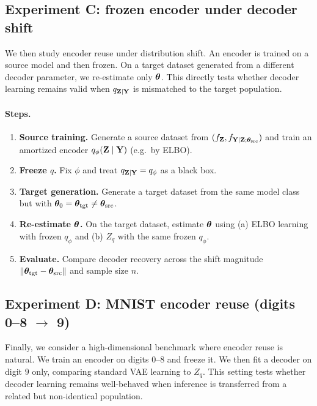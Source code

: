 \documentclass[twoside,11pt]{article}
\begin{document}
\subsection{Experiment C: frozen encoder under decoder shift}
\label{sec:simC}

We then study encoder reuse under distribution shift.  An encoder is trained on a source model and then frozen.  On a target dataset generated from a different decoder parameter, we re-estimate only ${\bm{\theta}}$.  This directly tests whether decoder learning remains valid when $q_{{\bf Z}\mid{\bf Y}}$ is mismatched to the target population.

\paragraph{Steps.}
\begin{enumerate}
\item \textbf{Source training.} Generate a source dataset from $(f_{\bf Z}, f_{{\bf Y}\mid{\bf Z};{\bm{\theta}}_{\mathrm{src}}})$ and train an amortized encoder $q_{\phi}({\bf Z}\mid{\bf Y})$ (e.g.\ by ELBO).
\item \textbf{Freeze $q$.} Fix $\phi$ and treat $q_{{\bf Z}\mid{\bf Y}}=q_{\phi}$ as a black box.
\item \textbf{Target generation.} Generate a target dataset from the same model class but with ${\bm{\theta}}_0={\bm{\theta}}_{\mathrm{tgt}}\neq {\bm{\theta}}_{\mathrm{src}}$.
\item \textbf{Re-estimate ${\bm{\theta}}$.} On the target dataset, estimate ${\bm{\theta}}$ using (a) ELBO learning with frozen $q_{\phi}$ and (b) $Z_q$ with the same frozen $q_{\phi}$.
\item \textbf{Evaluate.} Compare decoder recovery across the shift magnitude $\|{\bm{\theta}}_{\mathrm{tgt}}-{\bm{\theta}}_{\mathrm{src}}\|$ and sample size $n$.
\end{enumerate}

\subsection{Experiment D: MNIST encoder reuse (digits 0--8 $\to$ 9)}
\label{sec:simD}

Finally, we consider a high-dimensional benchmark where encoder reuse is natural.  We train an encoder on digits $0$--$8$ and freeze it.  We then fit a decoder on digit $9$ only, comparing standard VAE learning to $Z_q$.  This setting tests whether decoder learning remains well-behaved when inference is transferred from a related but non-identical population.
\end{document}
